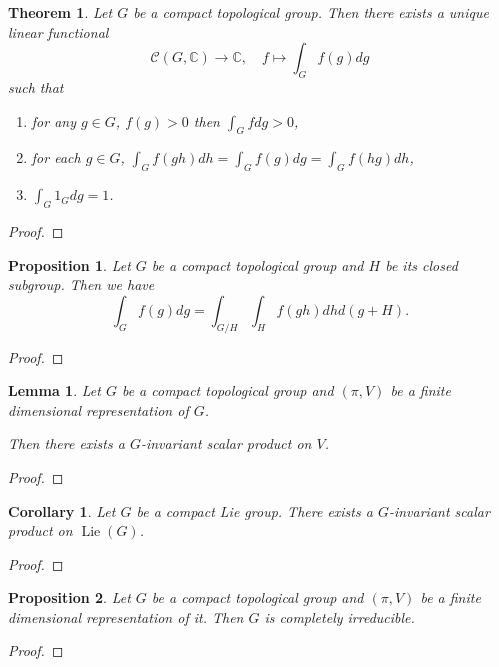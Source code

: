 \documentclass{article}
\newtheorem{theorem}{Theorem}[section]
\newtheorem{proposition}{Proposition}[section]
\newtheorem{lemma}{Lemma}[section]
\newtheorem{corollary}{Corollary}[section]
\numberwithin{equation}{section}
\DeclareMathOperator{\Lie}{Lie}
\begin{document}
\begin{theorem}
Let $G$ be a compact topological group. Then there exists a unique linear functional 
\begin{equation*}
\mathcal{C}(G,\mathbb{C})\to\mathbb{C},\quad f\mapsto \int_G f(g)dg
\end{equation*}
such that
\begin{enumerate}
\item for any $g\in G$, $f(g)>0$ then $\int_G f dg >0$,
\item for each $g\in G$, $\int_G f(gh)dh = \int_G f(g)dg = \int_G f(hg)dh$,
\item $\int_G 1_G dg = 1$.
\end{enumerate}
\end{theorem}

\begin{proof}
\end{proof}

\begin{proposition}
Let $G$ be a compact topological group and $H$ be its closed subgroup. Then we have
\begin{equation*}
\int_G f(g)dg = \int_{G/H}\int_H f(gh)dhd(g+H).
\end{equation*}
\end{proposition}

\begin{proof}
\end{proof}

\begin{lemma}
Let $G$ be a compact topological group and $(\pi,V)$ be a finite dimensional representation of $G$.\\
\par Then there exists a $G$-invariant scalar product on $V$.
\end{lemma}

\begin{proof}
\end{proof}

\begin{corollary}
Let $G$ be a compact Lie group. There exists a $G$-invariant scalar product on $\Lie(G)$. %
\end{corollary}

\begin{proof}
\end{proof}

\begin{proposition}
Let $G$ be a compact topological group and $(\pi,V)$ be a finite dimensional representation of it. Then $G$ is completely irreducible.
\end{proposition}
\begin{proof}
\end{proof}
\end{document}
